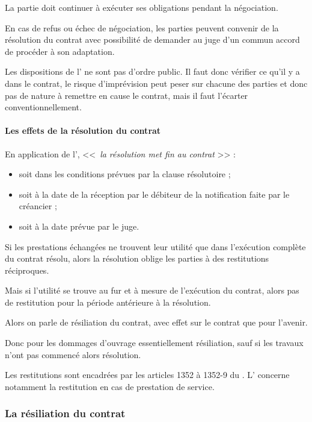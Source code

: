 						La partie doit continuer à exécuter ses obligations pendant la négociation.


						En cas de refus ou échec de négociation, les parties peuvent convenir de la résolution du contrat avec possibilité de demander au juge d’un commun accord de procéder à son adaptation.


						Les dispositions de l' ne sont pas d’ordre public. Il faut donc vérifier ce qu’il y a dans le contrat, le risque d’imprévision peut peser sur chacune des parties et donc pas de nature à remettre en cause le contrat, mais il faut l’écarter conventionnellement.


				\paragraph{Les effets de la résolution du contrat}

					En application de l', <<~\emph{la résolution met fin au contrat} >> :
					\begin{itemize}
						\item soit dans les conditions prévues par la clause résolutoire ;
						\item soit à la date de la réception par le débiteur de la notification faite par le créancier ;
						\item soit à la date prévue par le juge.
					\end{itemize}

					Si les prestations échangées ne trouvent leur utilité que dans l’exécution complète du contrat résolu, alors la résolution oblige les parties à des restitutions réciproques.


					Mais si l’utilité se trouve au fur et à mesure de l’exécution du contrat, alors pas de restitution pour la période antérieure à la résolution.

					Alors on parle de résiliation du contrat, avec effet sur le contrat que pour l’avenir.


					Donc pour les dommages d’ouvrage essentiellement résiliation, sauf si les travaux n’ont pas commencé alors résolution.


					Les restitutions sont encadrées par les articles 1352 à 1352-9 du \cciv. L' concerne notamment la restitution en cas de prestation de service.


			\subsubsection{La résiliation du contrat}\label{resiliationContrat}

